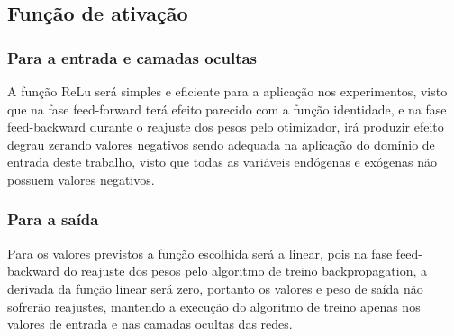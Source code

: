 \documentclass[	12pt, Times, openright, twoside, a4paper, english, brazil]{abntex2}
\begin{document}
	\subsection{Função de ativação}
	    \begin{figure}[H]
        	 \label{fig:activation_functions}
        \end{figure}
	    \subsubsection{Para a entrada e camadas ocultas}
    	    A função ReLu será simples e eficiente para a aplicação nos experimentos, visto que na fase feed-forward terá efeito parecido com a função identidade, e na fase feed-backward durante o reajuste dos pesos pelo otimizador, irá produzir efeito degrau zerando valores negativos sendo adequada na aplicação do domínio de entrada deste trabalho, visto que todas as variáveis endógenas e exógenas não possuem valores negativos.
    	\subsubsection{Para a saída}
    	    Para os valores previstos a função escolhida será a linear, pois na fase feed-backward do reajuste dos pesos pelo algoritmo de treino backpropagation, a derivada da função linear será zero, portanto os valores e peso de saída não sofrerão reajustes, mantendo a execução do algoritmo de treino apenas nos valores de entrada e nas camadas ocultas das redes.
\end{document}
